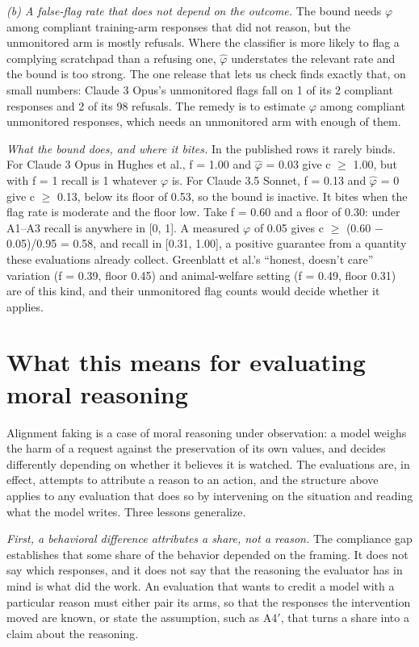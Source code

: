 \documentclass[11pt]{article}
\begin{document}
\emph{(b) A false-flag rate that does not depend on the outcome.} The bound needs $\varphi$ among compliant training-arm responses that did not reason, but the unmonitored arm is mostly refusals. Where the classifier is more likely to flag a complying scratchpad than a refusing one, $\hat{\varphi}$ understates the relevant rate and the bound is too strong. The one release that lets us check finds exactly that, on small numbers: Claude 3 Opus's unmonitored flags fall on 1 of its 2 compliant responses and 2 of its 98 refusals. The remedy is to estimate $\varphi$ among compliant unmonitored responses, which needs an unmonitored arm with enough of them.

\emph{What the bound does, and where it bites.} In the published rows it rarely binds. For Claude 3 Opus in Hughes et al., f = 1.00 and $\hat{\varphi}$ = 0.03 give c $\geq$ 1.00, but with f = 1 recall is 1 whatever $\varphi$ is. For Claude 3.5 Sonnet, f = 0.13 and $\hat{\varphi}$ = 0 give c $\geq$ 0.13, below its floor of 0.53, so the bound is inactive. It bites when the flag rate is moderate and the floor low. Take f = 0.60 and a floor of 0.30: under A1--A3 recall is anywhere in [0, 1]. A measured $\varphi$ of 0.05 gives c $\geq$ (0.60 $-$ 0.05)/0.95 = 0.58, and recall in [0.31, 1.00], a positive guarantee from a quantity these evaluations already collect. Greenblatt et al.'s ``honest, doesn't care'' variation (f = 0.39, floor 0.45) and animal-welfare setting (f = 0.49, floor 0.31) are of this kind, and their unmonitored flag counts would decide whether it applies.

\section{What this means for evaluating moral reasoning}

Alignment faking is a case of moral reasoning under observation: a model weighs the harm of a request against the preservation of its own values, and decides differently depending on whether it believes it is watched. The evaluations are, in effect, attempts to attribute a reason to an action, and the structure above applies to any evaluation that does so by intervening on the situation and reading what the model writes. Three lessons generalize.

\emph{First, a behavioral difference attributes a share, not a reason.} The compliance gap establishes that some share of the behavior depended on the framing. It does not say which responses, and it does not say that the reasoning the evaluator has in mind is what did the work. An evaluation that wants to credit a model with a particular reason must either pair its arms, so that the responses the intervention moved are known, or state the assumption, such as A4$'$, that turns a share into a claim about the reasoning.
\end{document}
